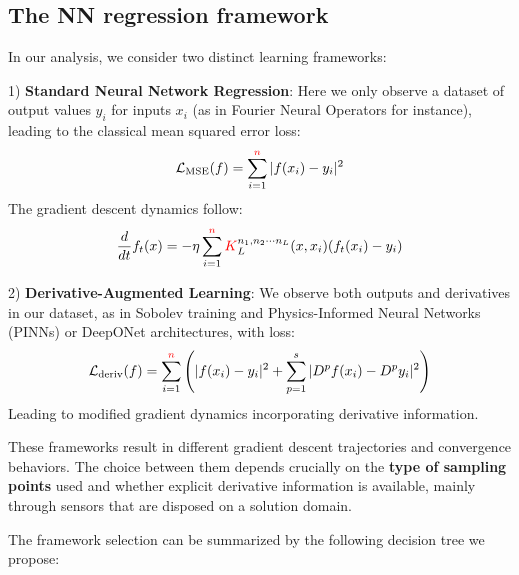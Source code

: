 \documentclass[a4paper]{article}
\theoremstyle{plain}
\theoremstyle{definition}
\theoremstyle{remark}
\begin{document}
\subsection{The NN regression framework}

In our analysis, we consider two distinct learning frameworks:

1) \textbf{Standard Neural Network Regression}: Here we only observe a dataset of output values $y_i$ for inputs $x_i$ (as in Fourier Neural Operators for instance), leading to the classical mean squared error loss:
$$\mathcal{L}_{\text{MSE}}(f) = \sum_{i=1}^{\textcolor{red}{n}} |f(x_i) - y_i|^2$$
The gradient descent dynamics follow:
$$\frac{d}{dt}f_t(x) = -\eta \sum_{i=1}^{\textcolor{red}{n}} \textcolor{red}{K}_L^{n_1, n_2 \cdots n_L}(x,x_i)(f_t(x_i) - y_i)$$

2) \textbf{Derivative-Augmented Learning}: We observe both outputs and derivatives in our dataset, as in Sobolev training and Physics-Informed Neural Networks (PINNs) or DeepONet architectures, with loss:
$$\mathcal{L}_{\text{deriv}}(f) = \sum_{i=1}^{\textcolor{red}{n}} \left(|f(x_i) - y_i|^2 + \sum_{p=1}^s |D^p f(x_i) - D^p y_i|^2\right)$$
Leading to modified gradient dynamics incorporating derivative information.

These frameworks result in different gradient descent trajectories and convergence behaviors. 
The choice between them depends crucially on the \textbf{type of sampling points} used and whether explicit derivative 
information is available, mainly through sensors that are disposed on a solution domain.


The framework selection can be summarized by the following decision tree we propose:
\end{document}
